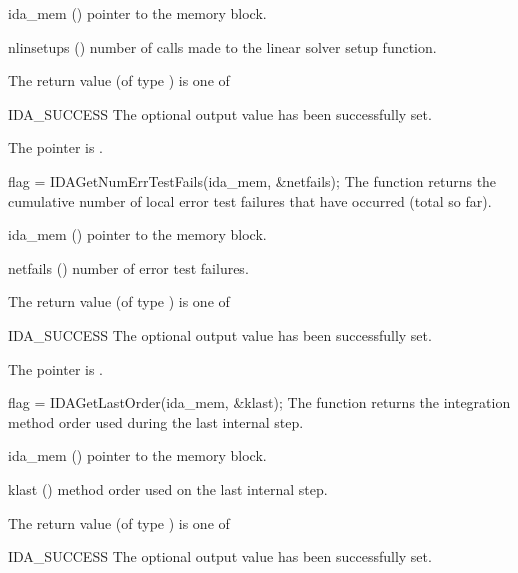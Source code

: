 {{\begin{args}[nlinsetups]
  \item[ida\_mem] ()
    pointer to the {\idas} memory block.
  \item[nlinsetups] ()
    number of calls made to the linear solver setup function.
  \end{args}
}
{
  The return value  (of type ) is one of
  \begin{args}
  \item[IDA\_SUCCESS]
    The optional output value has been successfully set.
  \item[\Id{IDA\_MEM\_NULL}]
    The  pointer is .
  \end{args}
}
{}
{
  flag = IDAGetNumErrTestFails(ida\_mem, \&netfails);
}
{
  The function  returns the
  cumulative number of local error test failures that have occurred
  (total so far).
}
{
  \begin{args}[netfails]
  \item[ida\_mem] ()
    pointer to the {\idas} memory block.
  \item[netfails] ()
    number of error test failures.
  \end{args}
}
{
  The return value  (of type ) is one of
  \begin{args}
  \item[IDA\_SUCCESS]
    The optional output value has been successfully set.
  \item[\Id{IDA\_MEM\_NULL}]
    The  pointer is .
  \end{args}
}
{}
{
  flag = IDAGetLastOrder(ida\_mem, \&klast);
}
{
  The function  returns the
  integration method order used during the last internal step.
}
{
  \begin{args}
  \item[ida\_mem] ()
    pointer to the {\idas} memory block.
  \item[klast] ()
    method order used on the last internal step.
  \end{args}
}
{
  The return value  (of type ) is one of
  \begin{args}
  \item[IDA\_SUCCESS]
    The optional output value has been successfully set.
  \item[\Id{IDA\_MEM\_NULL}]

\end{args}}}
